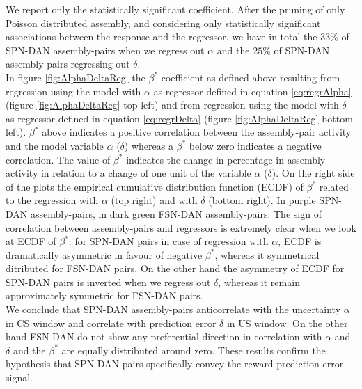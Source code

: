 We report only the statistically significant coefficient. After the pruning of only Poisson distributed assembly, and considering only statistically significant associations between the response and the regressor, we have in total the $33\%$ of SPN-DAN assembly-pairs when we regress out $\alpha$ and the $25\%$ of SPN-DAN assembly-pairs regressing out $\delta$.\\In figure \ref{fig:AlphaDeltaReg} the $\beta^*$ coefficient as defined above resulting from regression using the model with $\alpha$ as regressor defined in equation \ref{eq:regrAlpha} (figure \ref{fig:AlphaDeltaReg} top left) and from regression using the model with $\delta$ as regressor defined in equation \ref{eq:regrDelta} (figure \ref{fig:AlphaDeltaReg} bottom left). $\beta^*$ above indicates a positive correlation between the assembly-pair activity and the model variable $\alpha$ ($\delta$) whereas a $\beta^*$ below zero indicates a negative correlation. The value of $\beta^*$ indicates the change in percentage in assembly activity in relation to a change of one unit of the variable $\alpha$ ($\delta$). On the right side of the plots the empirical cumulative distribution function (ECDF) of $\beta^*$ related to the regression with $\alpha$ (top right) and with $\delta$ (bottom right). In purple SPN-DAN assembly-pairs, in dark green FSN-DAN assembly-pairs. The sign of correlation between assembly-pairs and regressors is extremely clear when we look at ECDF of $\beta^*$: for SPN-DAN pairs in case of regression with $\alpha$, ECDF is dramatically asymmetric in favour of negative $\beta^*$, whereas it symmetrical ditributed for FSN-DAN pairs. On the other hand the asymmetry of ECDF for SPN-DAN pairs is inverted when we regress out $\delta$, whereas it remain approximately symmetric for FSN-DAN pairs.\\We conclude that SPN-DAN assembly-pairs anticorrelate with the uncertainty $\alpha$ in CS window and correlate with prediction error $\delta$ in US window. On the other hand FSN-DAN do not show any preferential direction in correlation with $\alpha$ and $\delta$ and the $\beta^*$ are equally distributed around zero. These results confirm the hypothesis that SPN-DAN pairs specifically convey the reward prediction error signal.\\
